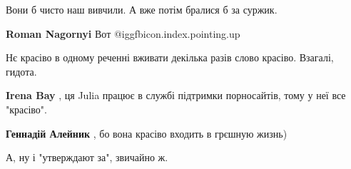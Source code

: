 \begin{itemize}
Вони б чисто наш вивчили. А вже потім бралися б за суржик.

\begin{itemize}
 
\textbf{Roman Nagornyi} Вот
@igg{fbicon.index.pointing.up}
\end{itemize}

 
Нє красіво в одному реченні вживати декілька разів слово красіво. Взагалі, гидота.

\begin{itemize}
 
\textbf{Irena Bay} , ця Julia працює в службі підтримки порносайтів, тому у неї все "красіво".

 
\textbf{Геннадій Алейник} , бо вона красіво входить в грєшную жизнь)
\end{itemize}

 
А, ну і "утверждают за", звичайно ж.

 


\end{itemize}
